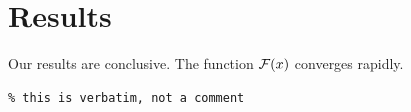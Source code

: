 \section{Results}
Our results are conclusive. The function \(\mathcal{F}(x)\) converges rapidly.
\begin{verbatim}
% this is verbatim, not a comment

\end{verbatim}

